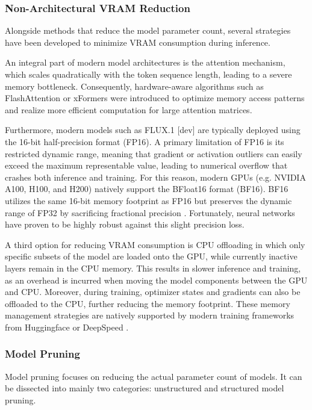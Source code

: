 \subsubsection{Non-Architectural VRAM Reduction}
Alongside methods that reduce the model parameter count, several strategies have been developed to minimize VRAM consumption during inference. 

An integral part of modern model architectures is the attention mechanism, which scales quadratically with the token sequence length, leading to a severe memory bottleneck. Consequently, hardware-aware algorithms such as FlashAttention \cite{FlashAttention} or xFormers \cite{lefaudeux2022xformers} were introduced to optimize memory access patterns and realize more efficient computation for large attention matrices. 

Furthermore, modern models such as FLUX.1 [dev] are typically deployed using the 16-bit half-precision format (FP16). A primary limitation of FP16 is its restricted dynamic range, meaning that gradient or activation outliers can easily exceed the maximum representable value, leading to numerical overflow that crashes both inference and training. For this reason, modern GPUs (e.g. NVIDIA A100, H100, and H200) natively support the BFloat16 format (BF16). BF16 utilizes the same 16-bit memory footprint as FP16 but preserves the dynamic range of FP32 by sacrificing fractional precision \cite{BF16}. Fortunately, neural networks have proven to be highly robust against this slight precision loss. 

 A third option for reducing \gls{VRAM} consumption is CPU offloading in which only specific subsets of the model are loaded onto the GPU, while currently inactive layers remain in the CPU memory.
  This results in slower inference and training, as an overhead is incurred when moving the model components between the GPU and CPU. Moreover, during training, optimizer states and gradients can also be offloaded to the CPU, further reducing the memory footprint. These memory management strategies are natively supported by modern training frameworks from Huggingface \cite{accelerate} or DeepSpeed \cite{ren2021zero,rajbhandari2021zero}. 
 
 \subsubsection{Model Pruning}
 Model pruning \cite{liu2020topological,janowsky1989pruning,mozer1989using} focuses on reducing the actual parameter count of models. It can be dissected into mainly two categories: unstructured \cite{nordstrom2022unstructured,frantar2023sparsegpt,han2015learning} and structured \cite{wen2016learning,anwar2017structured} model pruning. 
 
